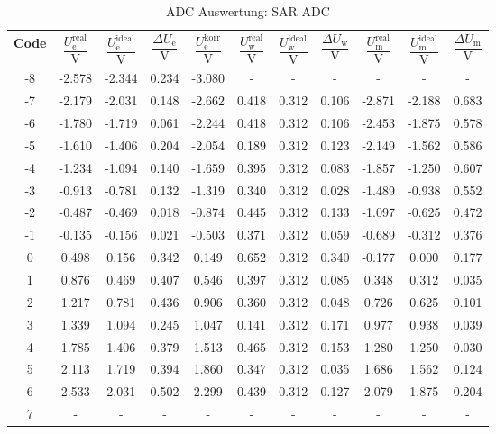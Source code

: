 \begin{table}[htbp]
\centering
\caption{ADC Auswertung: SAR ADC}
\label{tab:sar_adc}
\begin{tabular}{c|cccc|ccc|ccc}
Code & $\dfrac{U^\mathrm{real}_{\mathrm{e}}}{\si{\volt}}$ & $\dfrac{U^\mathrm{ideal}_{\mathrm{e}}}{\si{\volt}}$ & $\dfrac{\Delta U_{\mathrm{e}}}{\si{\volt}}$ & $\dfrac{U^\mathrm{korr}_{\mathrm{e}}}{\si{\volt}}$ & $\dfrac{U^\mathrm{real}_{\mathrm{w}}}{\si{\volt}}$ & $\dfrac{U^\mathrm{ideal}_{\mathrm{w}}}{\si{\volt}}$ & $\dfrac{\Delta U_{\mathrm{w}}}{\si{\volt}}$ & $\dfrac{U^\mathrm{real}_{\mathrm{m}}}{\si{\volt}}$ & $\dfrac{U^\mathrm{ideal}_{\mathrm{m}}}{\si{\volt}}$ & $\dfrac{\Delta U_{\mathrm{m}}}{\si{\volt}}$ \\
\midrule
-8 & -2.578 & -2.344 & {\cellcolor[HTML]{35CCFF} 0.234} & -3.080 & - & - & - & - & - & - \\
-7 & -2.179 & -2.031 & 0.148 & -2.662 & 0.418 & 0.312 & 0.106 & -2.871 & -2.188 & {\cellcolor[HTML]{FF728A} 0.683} \\
-6 & -1.780 & -1.719 & 0.061 & -2.244 & 0.418 & 0.312 & 0.106 & -2.453 & -1.875 & 0.578 \\
-5 & -1.610 & -1.406 & 0.204 & -2.054 & 0.189 & 0.312 & 0.123 & -2.149 & -1.562 & 0.586 \\
-4 & -1.234 & -1.094 & 0.140 & -1.659 & 0.395 & 0.312 & 0.083 & -1.857 & -1.250 & 0.607 \\
-3 & -0.913 & -0.781 & 0.132 & -1.319 & 0.340 & 0.312 & 0.028 & -1.489 & -0.938 & 0.552 \\
-2 & -0.487 & -0.469 & 0.018 & -0.874 & 0.445 & 0.312 & 0.133 & -1.097 & -0.625 & 0.472 \\
-1 & -0.135 & -0.156 & 0.021 & -0.503 & 0.371 & 0.312 & 0.059 & -0.689 & -0.312 & 0.376 \\
0 & 0.498 & 0.156 & {\cellcolor[HTML]{8FFF5B} 0.342} & 0.149 & 0.652 & 0.312 & {\cellcolor[HTML]{FFEC21} 0.340} & -0.177 & 0.000 & 0.177 \\
1 & 0.876 & 0.469 & 0.407 & 0.546 & 0.397 & 0.312 & 0.085 & 0.348 & 0.312 & 0.035 \\
2 & 1.217 & 0.781 & 0.436 & 0.906 & 0.360 & 0.312 & 0.048 & 0.726 & 0.625 & 0.101 \\
3 & 1.339 & 1.094 & 0.245 & 1.047 & 0.141 & 0.312 & 0.171 & 0.977 & 0.938 & 0.039 \\
4 & 1.785 & 1.406 & 0.379 & 1.513 & 0.465 & 0.312 & 0.153 & 1.280 & 1.250 & 0.030 \\
5 & 2.113 & 1.719 & 0.394 & 1.860 & 0.347 & 0.312 & 0.035 & 1.686 & 1.562 & 0.124 \\
6 & 2.533 & 2.031 & {\cellcolor[HTML]{FF8438} 0.502} & 2.299 & 0.439 & 0.312 & 0.127 & 2.079 & 1.875 & 0.204 \\
7 & - & - & - & - & - & - & - & - & - & - \\
\end{tabular}
\end{table}
